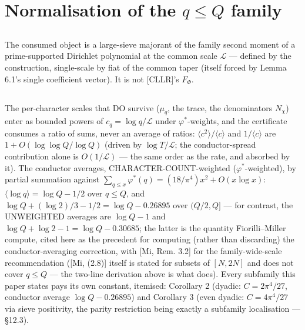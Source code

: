 \documentclass[11pt]{amsart}
\theoremstyle{plain}
\theoremstyle{remark}
\begin{document}
\section{Normalisation of the $q \le Q$ family}

\subsection{}
The consumed object is a large-sieve majorant of the family second moment of a
prime-supported Dirichlet polynomial at the common scale $\mathcal{L}$ --- defined by
the construction, single-scale by fiat of the common taper (itself forced by Lemma
6.1's single coefficient vector). It is not [CLLR]'s $F_\Phi$.

\subsection{}
The per-character scales that DO survive ($\mu_q$, the trace, the denominators
$N_\chi$) enter as bounded powers of $c_q = \log q/\mathcal{L}$ under
$\varphi^{*}$-weights, and the certificate consumes a ratio of sums, never an average
of ratios: $\langle c^2\rangle/\langle c\rangle$ and $1/\langle c\rangle$ are
$1 + O(\log \log Q/\log Q)$ (driven by $\log T/\mathcal{L}$; the conductor-spread
contribution alone is $O(1/\mathcal{L})$ --- the same order as the rate, and absorbed
by it). The conductor averages, CHARACTER-COUNT-weighted ($\varphi^{*}$-weighted), by
partial summation against $\sum_{q\le x}\varphi^{*}(q) = (18/\pi^4)x^2 + O(x \log x)$:
$\langle \log q\rangle = \log Q - 1/2$ over $q \le Q$, and
$\log Q + (\log 2)/3 - 1/2 = \log Q - 0.26895$ over $(Q/2, Q]$ --- for contrast, the
UNWEIGHTED averages are $\log Q - 1$ and $\log Q + \log 2 - 1 = \log Q - 0.30685$;
the latter is the quantity Fiorilli--Miller compute, cited here as the precedent for
computing (rather than discarding) the conductor-averaging correction, with
[Mi, Rem. 3.2] for the family-wide-scale recommendation ([Mi, (2.8)] itself is stated
for subsets of $[N, 2N]$ and does not cover $q \le Q$ --- the two-line derivation
above is what does). Every subfamily this paper states pays its own constant,
itemised: Corollary 2 (dyadic: $C = 2\pi^4/27$, conductor average
$\log Q - 0.26895$) and Corollary 3 (even dyadic: $C = 4\pi^4/27$ via sieve
positivity, the parity restriction being exactly a subfamily localisation ---
\S12.3).
\end{document}
